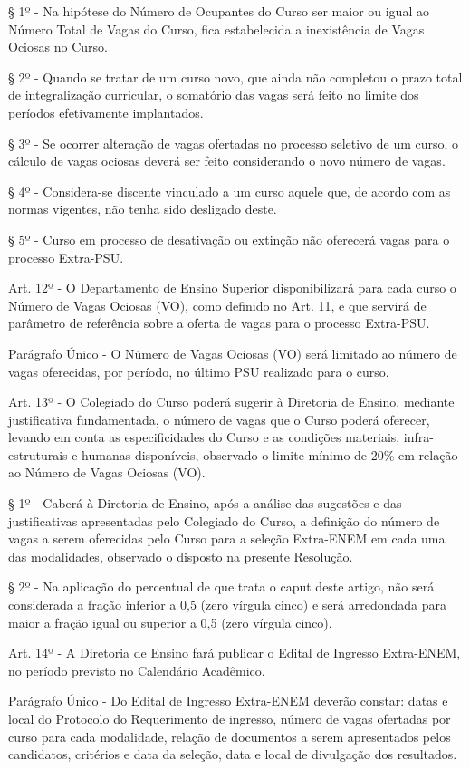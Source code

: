 § 1º - Na hipótese do Número de Ocupantes do Curso ser maior ou igual ao Número Total de Vagas do Curso, fica estabelecida a inexistência de Vagas Ociosas no Curso.

§ 2º - Quando se tratar de um curso novo, que ainda não completou o prazo total de integralização curricular, o somatório das vagas será feito no limite dos períodos efetivamente implantados.

§ 3º - Se ocorrer alteração de vagas ofertadas no processo seletivo de um curso, o cálculo de vagas ociosas deverá ser feito considerando o novo número de vagas.

§ 4º - Considera-se discente vinculado a um curso aquele que, de acordo com as normas vigentes, não tenha sido desligado deste.

§ 5º - Curso em processo de desativação ou extinção não oferecerá vagas para o processo Extra-PSU.

Art. 12º - O Departamento de Ensino Superior disponibilizará para cada curso o Número de Vagas Ociosas (VO), como definido no Art. 11, e que servirá de parâmetro de referência sobre a oferta de vagas para o processo Extra-PSU.

Parágrafo Único - O Número de Vagas Ociosas (VO) será limitado ao número de vagas oferecidas, por período, no último PSU realizado para o curso.

Art. 13º - O Colegiado do Curso poderá sugerir à Diretoria de Ensino, mediante justificativa fundamentada, o número de vagas que o Curso poderá oferecer, levando em conta as especificidades do Curso e as condições materiais, infra-estruturais e humanas disponíveis, observado o limite mínimo de 20\% em relação ao Número de Vagas Ociosas (VO).

§ 1º - Caberá à Diretoria de Ensino, após a análise das sugestões e das justificativas apresentadas pelo Colegiado do Curso, a definição do número de vagas a serem oferecidas pelo Curso para a seleção Extra-ENEM em cada uma das modalidades, observado o disposto na presente Resolução.

§ 2º - Na aplicação do percentual de que trata o caput deste artigo, não será considerada a fração inferior a 0,5 (zero vírgula cinco) e será arredondada para maior a fração igual ou superior a 0,5 (zero vírgula cinco).

Art. 14º - A Diretoria de Ensino fará publicar o Edital de Ingresso Extra-ENEM, no período previsto no Calendário Acadêmico.

Parágrafo Único - Do Edital de Ingresso Extra-ENEM deverão constar: datas e local do Protocolo do Requerimento de ingresso, número de vagas ofertadas por curso para cada modalidade, relação de documentos a serem apresentados pelos candidatos, critérios e data da seleção, data e local de divulgação dos resultados.


